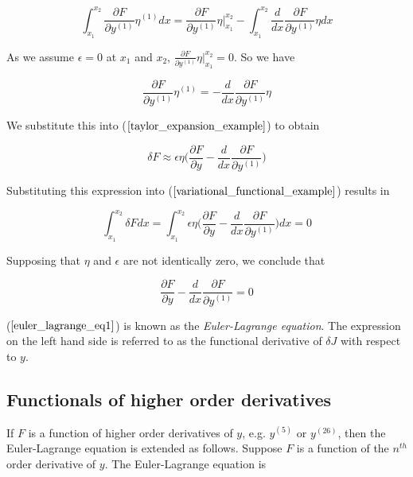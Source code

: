 \documentclass[]{article}
\begin{document}
\begin{equation*} \int_{x_{1}}^{x_{2}} \frac{\partial F}{\partial y^{(1)}}\eta^{(1)}dx = \frac{\partial F}{\partial y^{(1)}}\eta \bigg|_{x_1}^{x_{2}} - \int_{x_{1}}^{x_{2}} \frac{d}{dx}\frac{\partial F}{\partial y^{(1)}}\eta dx\end{equation*}

As we assume $\epsilon =0$ at $x_{1}$ and $x_{2}$, $\frac{\partial F}{\partial y^{(1)}}\eta \bigg|_{x_1}^{x_{2}} = 0$. So we have

\begin{equation*} \frac{\partial F}{\partial y^{(1)}}\eta^{(1)} = - \frac{d}{dx}\frac{\partial F}{\partial y^{(1)}}\eta \end{equation*}

We substitute this into ($\ref{taylor_expansion_example}$) to obtain

\begin{equation*} \delta F \approx \epsilon \eta \bigg(\frac{\partial F}{\partial y} - \frac{d}{dx}\frac{\partial F}{\partial y^{(1)}}\bigg) \label{simplified_taylor_expansion} \end{equation*}

Substituting this expression into ($\ref{variational_functional_example}$) results in

\begin{equation*} \int_{x_{1}}^{x_{2}} \delta F dx = \int_{x_{1}}^{x_{2}} \epsilon \eta \bigg(\frac{\partial F}{\partial y} - \frac{d}{dx}\frac{\partial F}{\partial y^{(1)}}\bigg) dx = 0 \label{variational_eta_final} \end{equation*}

Supposing that $\eta$ and $\epsilon$ are not identically zero, we conclude that 

\begin{equation} \frac{\partial F}{\partial y} - \frac{d}{dx}\frac{\partial F}{\partial y^{(1)}} = 0 \label{euler_lagrange_eq1} \end{equation}

($\ref{euler_lagrange_eq1}$) is known as the \textit{Euler-Lagrange equation}. The expression on the left hand side is referred to as the functional derivative of $\delta J$ with respect to $y$.

\subsection{Functionals of higher order derivatives}
If $F$ is a function of higher order derivatives of $y$, e.g. $y^{(5)}$ or $y^{(26)}$, then the Euler-Lagrange equation is extended as follows. Suppose $F$ is a function of the $n^{th}$ order derivative of $y$. The Euler-Lagrange equation is
\end{document}
